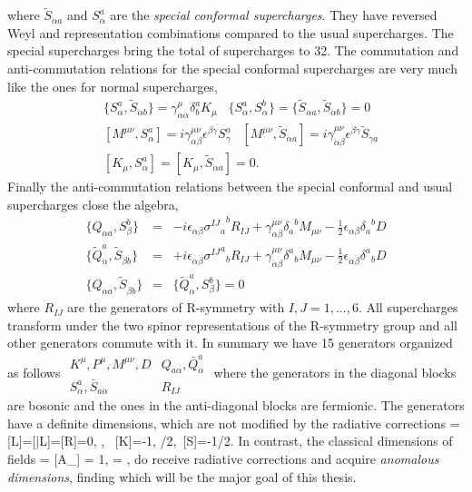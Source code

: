 where $\tilde{S}_{\dot{\alpha} a}$ and $S_\alpha^a$ are the \emph{special conformal supercharges}. 
They have reversed Weyl and  representation combinations compared to the usual supercharges. 
The special supercharges bring the total of supercharges to 32. 
The commutation and anti-commutation relations for the special conformal supercharges are very much like the ones for normal supercharges,
\begin{eqnarray}
	& \{S_{\alpha}^a, \tilde{S}_{\dot{\alpha} b}\} = \gamma^\mu_{\alpha\dot{\alpha}} \delta_b^a K_\mu \; \; \; \{S_{\alpha}^a, S_{\alpha}^b\} = \{ \tilde{S}_{\dot{\alpha} a}, \tilde{S}_{\dot{\alpha} b} \} = 0 \nonumber\\
	& [M^{\mu\nu}, S_{\alpha}^a] = i \gamma^{\mu\nu}_{\alpha\beta} \epsilon^{\beta\gamma} S_{\gamma}^a \; \; \; [M^{\mu\nu}, \tilde{S}_{\dot{\alpha} a}] = i \gamma^{\mu\nu}_{\dot{\alpha}\dot{\beta}} \epsilon^{\dot{\beta}\dot{\gamma}} \tilde{S}_{\dot{\gamma} a} \nonumber \\
	& [K_\mu, S_{\alpha}^a] = [K_\mu, \tilde{S}_{\dot{\alpha} a}] = 0.
\end{eqnarray} 
Finally the anti-commutation relations between the special conformal and usual supercharges close the algebra,
\begin{eqnarray}
	\{ Q_{\alpha a}, S_\beta^b \} & = & - i \epsilon_{\alpha\beta} {{\sigma^{IJ}}_a}^b R_{IJ} + \gamma_{\alpha\beta}^{\mu\nu} {\delta_a}^b M_{\mu\nu} - \frac{1}{2} \epsilon_{\alpha\beta} {\delta_a}^b D \nonumber \\
	\{ \tilde{Q}_{\dot{\alpha}}^a, \tilde{S}_{\dot{\beta} b} \} & = & + i \epsilon_{\dot{\alpha}\dot{\beta}} {{\sigma^{IJ}}^a}_b R_{IJ} + \gamma_{\dot{\alpha}\dot{\beta}}^{\mu\nu} {\delta^a}_b M_{\mu\nu} - \frac{1}{2} \epsilon_{\dot{\alpha}\dot{\beta}} {\delta^a}_b D \nonumber \\
	\{ Q_{\alpha a}, \tilde{S}_{\dot{\beta} b} \} & = & \{ \tilde{Q}_{\dot{\alpha}}^a, S_\beta^b \} = 0
	\label{eq:qs_anticommutators}
\end{eqnarray}
where $R_{IJ}$ are the generators of R-symmetry with $I,J = 1, ..., 6$. 
All supercharges transform under the two spinor representations of the R-symmetry group and all other generators commute with it. In summary we have 15 generators organized as follows
\beq
\(
	\begin{array}{c|c}
	K^\mu, P^\mu, M^{\mu\nu}, D & Q_{a\alpha}, \bar{Q}_{\dot{\alpha}}^a \\ \hline 
	S_{\alpha}^a, \bar{S}_{a\dot{\alpha}}  & R_{IJ}
	\end{array} 
\)
\eeq
where the generators in the diagonal blocks are bosonic and the ones in the anti-diagonal blocks are fermionic.
The generators have a definite dimensions, which are not modified by the radiative corrections
\beq
	[D]=[L]=[\bar L]=[R]=0\;, \;, \ [K]=-1\;, /2\;,\  [S]=-1/2\;.
\eeq
In contrast, the classical dimensions of fields
\beq
	[\Phi^I] = [A_\mu] = 1\;, \quad [\psi_a] = ,
\eeq
do receive radiative corrections and acquire \emph{anomalous dimensions}, finding which will be the major goal of this thesis.


